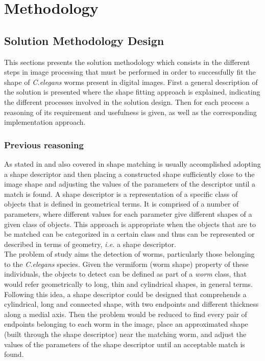 \cleardoublepage  
\chapter{Methodology}
\label{chap:methodology}

\section{Solution Methodology Design}
\label{sec:solmet}

This sections presents the solution methodology which consists in the different
steps in image processing that must be performed in order to successfully fit the shape of 
\emph{C.elegans} worms present in digital images. First a general description
of the solution is presented where the shape fitting approach is explained, indicating
the different processes involved in the solution design. Then for each process 
a reasoning of its requirement and usefulness is given, as well as 
the corresponding 
implementation approach.

\subsection{Previous reasoning}
\label{sec:reasoning}

As stated in \cite{binaryshape} and also covered in
\cite{deformable,matching2,matchingbook} shape 
matching is usually accomplished adopting a shape
descriptor and then placing a constructed shape sufficiently 
close to the image shape and adjusting the values of 
the parameters of the descriptor until a match is found.
A shape descriptor is a representation of a 
specific class of objects that is defined in geometrical
terms. It is comprised of a number of parameters, where 
different values for each parameter give different 
shapes of a given class of objects.
This approach is appropriate when the objects
that are to be matched can be categorized in a certain 
class and thus can be represented or described in terms
of geometry, \emph{i.e.} a shape descriptor.\\

The problem of study aims the detection of worms,
particularly those belonging to the \emph{C.elegans} species. Given
the vermiform (worm shape) property of these individuals,
the objects to detect can be defined as part of a 
\emph{worm} class,
that would refer geometrically to long, thin and cylindrical 
shapes, in 
general terms. Following this idea, a shape descriptor could be
designed that comprehends a cylindrical, long and connected
shape, with two endpoints and different thickness along a medial
axis. Then the problem would be reduced to find every pair of
endpoints belonging to each worm in the image, place an approximated
shape (built through the shape descriptor) near the matching worm,
and adjust the values of the parameters of the shape descriptor until
an acceptable match is found.\\

